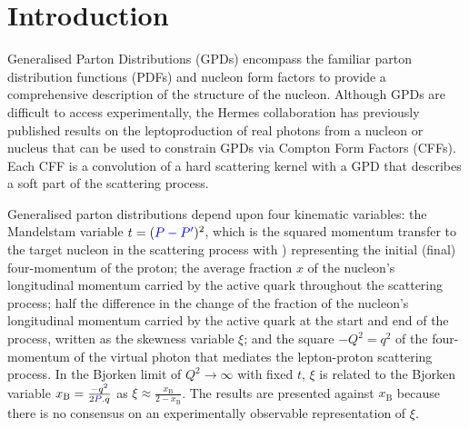 \section{Introduction}
Generalised Parton Distributions (GPDs)
\cite{Mue94,Ji97a,Rad97} encompass the familiar parton
distribution functions (PDFs) and nucleon form factors to provide a
comprehensive description of the structure of the nucleon.
Although GPDs are difficult to access experimentally, the H{\sc ermes}
collaboration has previously published results
\cite{Air01,Air06,Air08,Air09,Air10, Air10a, Air10b, Air11} on
the leptoproduction of real photons from a nucleon or nucleus that can be used to constrain GPDs via Compton Form Factors (CFFs). Each CFF is a convolution of a hard scattering kernel with a GPD that describes a soft part of the scattering process.

Generalised parton distributions depend upon four kinematic variables: the
Mandelstam variable $t=({\color{blue}{P-P^{\prime}}\color{black}})^2$, which is the squared momentum
transfer to the target nucleon in the scattering process with )
representing the initial (final) four-momentum of the proton; the average
fraction $x$ of the nucleon's longitudinal momentum carried by the active
quark throughout the scattering process; half the difference in the
change of the fraction of the nucleon's longitudinal momentum carried by the
active quark at the start and end of the process, written as the skewness
variable $\xi$; and the square $-Q^2=q^2$ of the four-momentum of the virtual photon that mediates the lepton-proton scattering process. In the Bjorken limit of $Q^2\rightarrow\infty$ with
fixed $t$, $\xi$ is related to the Bjorken variable
$x_{\textrm{B}}=\frac{-q^2}{2{\color{blue}{P}\color{black}}.q}$ as
$\xi\approx\frac{x_\textrm{B}}{2-x_\textrm{B}}$. The results are presented
against $x_{\textrm{B}}$ because there is no consensus on an experimentally
observable representation of $\xi$. 

